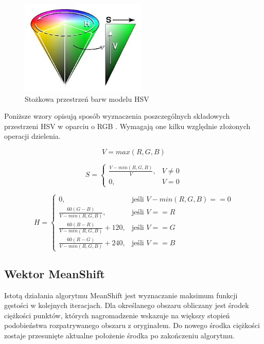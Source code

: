\begin{figure}[h]
	\centering
	\includegraphics[width=6cm]{2_HSV.jpg}
	\caption{Stożkowa przestrzeń barw modelu HSV \cite{HSV}} %
	\label{fig:HSV_cone}
\end{figure}

Poniższe wzory opisują sposób wyznaczenia poszczególnych składowych przestrzeni HSV w oparciu o RGB \cite{Kryjak}. Wymagają one kilku względnie złożonych operacji dzielenia.

\begin{equation}
\label{HSV_first}
V=max(R,G,B)
\end{equation}

\begin{equation}
S=\begin{cases}
\frac{V-min(R,G,B)}{V}, & V\neq0 \\
0, & V=0
\end{cases}
\end{equation}

\begin{equation}
\label{HSV_last}
H=\begin{cases}
	0, & \text{jeśli } V-min(R,G,B)==0 \\
	\frac{60(G-B)}{V-min(R,G,B)}, & \text{jeśli } V==R \\
	\frac{60(B-R)}{V-min(R,G,B)}+120, & \text{jeśli } V==G \\
	\frac{60(R-G)}{V-min(R,G,B)}+240, & \text{jeśli } V==B 
\end{cases}
\end{equation}



\subsection{Wektor MeanShift}
\label{ssec:MS}

Istotą działania algorytmu MeanShift jest wyznaczanie maksimum funkcji gęstości w kolejnych iteracjach. 
Dla określanego obszaru obliczany jest środek ciężkości punktów, których nagromadzenie wskazuje na większy stopień podobieństwa rozpatrywanego obszaru z oryginałem. Do nowego środka ciężkości zostaje przesunięte aktualne położenie środka po zakończeniu algorytmu. %

